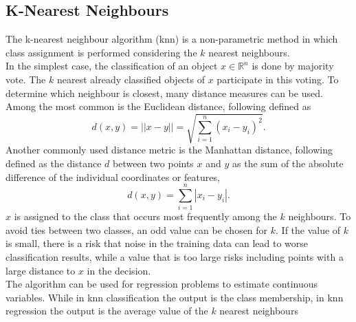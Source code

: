 \subsection{K-Nearest Neighbours}
The k-nearest neighbour algorithm (knn) is a non-parametric method in which class assignment is performed considering the $k$ nearest neighbours. \\
In the simplest case, the classification of an object $x\in\mathbb{R}^n$ is done by majority vote. The $k$ nearest already classified objects of $x$ participate in this voting. To determine which neighbour is closest, many distance measures can be used. Among the most common is the Euclidean distance, following \cite{danielsson1980euclidean} defined as
\begin{equation}
    d\left(x,y\right)=\left|\left|x-y\right|\right|=\sqrt{\sum_{i=1}^n\left(x_i-y_i\right)^2}.
\end{equation} \clearpage
Another commonly used distance metric is the Manhattan distance, following \cite{krause1986taxicab} defined as the distance $d$ between two points $x$ and $y$ as the sum of the absolute difference of the individual coordinates or features,
\begin{equation}
    d\left(x, y\right) = \sum_{i=1}^n\left|x_i-y_i\right|.
\end{equation}
$x$ is assigned to the class that occurs most frequently among the $k$ neighbours. To avoid ties between two classes, an odd value can be chosen for $k$. 
If the value of $k$ is small, there is a risk that noise in the training data can lead to worse classification results, while a value that is too large risks including points with a large distance to $x$ in the decision. \\
The algorithm can be used for regression problems to estimate continuous variables. While in knn classification the output is the class membership, in knn regression the output is the average value of the $k$ nearest neighbours \autocite[][]{altman1992introduction}
